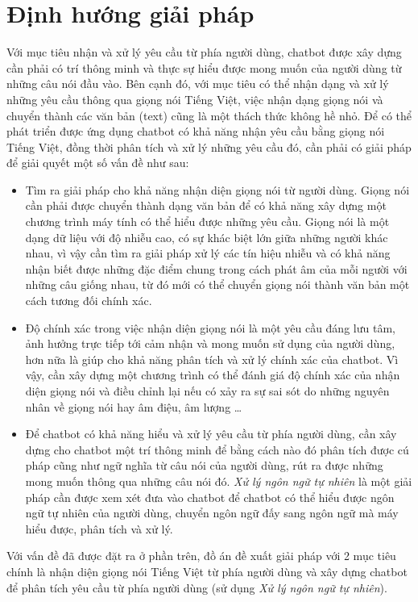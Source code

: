 \documentclass[12pt]{report}
\begin{document}
\chapter{Định hướng giải pháp}

Với mục tiêu nhận và xử lý yêu cầu từ phía người dùng, chatbot được xây dựng cần phải có trí thông minh và thực sự hiểu được mong muốn của người dùng từ những câu nói đầu vào. Bên cạnh đó, với mục tiêu có thể nhận dạng và xử lý những yêu cầu thông qua giọng nói Tiếng Việt, việc nhận dạng giọng nói và chuyển thành các văn bản (text) cũng là một thách thức không hề nhỏ. Để có thể phát triển được ứng dụng chatbot có khả năng nhận yêu cầu bằng giọng nói Tiếng Việt, đồng thời phân tích và xử lý những yêu cầu đó, cần phải có giải pháp để giải quyết một số vấn đề như sau:

\begin{itemize}
	\item Tìm ra giải pháp cho khả năng nhận diện giọng nói từ người dùng. Giọng nói cần phải được chuyển thành dạng văn bản để có khả năng xây dựng một chương trình máy tính có thể hiểu được những yêu cầu. Giọng nói là một dạng dữ liệu với độ nhiễu cao, có sự khác biệt lớn giữa những người khác nhau, vì vậy cần tìm ra giải pháp xử lý các tín hiệu nhiễu và có khả năng nhận biết được những đặc điểm chung trong cách phát âm của mỗi người với những câu giống nhau, từ đó mới có thể chuyển giọng nói thành văn bản một cách tương đối chính xác.
	\item Độ chính xác trong việc nhận diện giọng nói là một yêu cầu đáng lưu tâm, ảnh hưởng trực tiếp tới cảm nhận và mong muốn sử dụng của người dùng, hơn nữa là giúp cho khả năng phân tích và xử lý chính xác của chatbot. Vì vậy, cần xây dựng một chương trình có thể đánh giá độ chính xác của nhận diện giọng nói và điều chỉnh lại nếu có xảy ra sự sai sót do những nguyên nhân về giọng nói hay âm điệu, âm lượng \ldots
	\item Để chatbot có khả năng hiểu và xử lý yêu cầu từ phía người dùng, cần xây dựng cho chatbot một trí thông minh để bằng cách nào đó phân tích được cú pháp cũng như ngữ nghĩa từ câu nói của người dùng, rút ra được những mong muốn thông qua những câu nói đó. \textit{Xử lý ngôn ngữ tự nhiên} là một giải pháp cần được xem xét đưa vào chatbot để chatbot có thể hiểu được ngôn ngữ tự nhiên của người dùng, chuyển ngôn ngữ đấy sang ngôn ngữ mà máy hiểu được, phân tích và xử lý.
\end{itemize}

Với vấn đề đã được đặt ra ở phần trên, đồ án đề xuất giải pháp với 2 mục tiêu chính là nhận diện giọng nói Tiếng Việt từ phía người dùng và xây dựng chatbot để phân tích yêu cầu từ phía người dùng (sử dụng \textit{Xử lý ngôn ngữ tự nhiên}).
\end{document}
